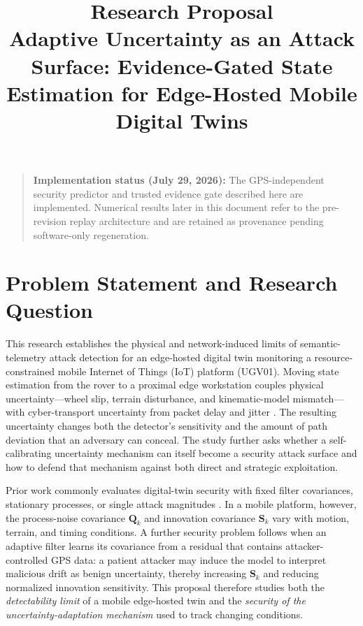 \documentclass[11pt,a4paper]{article}
\title{\textbf{Research Proposal}\\ Adaptive Uncertainty as an Attack Surface: Evidence-Gated State Estimation for Edge-Hosted Mobile Digital Twins}
\author{}
\date{}
\begin{document}
\maketitle

\begin{quote}
\textbf{Implementation status (July 29, 2026):} The GPS-independent security
predictor and trusted evidence gate described here are implemented. Numerical
results later in this document refer to the pre-revision replay architecture
and are retained as provenance pending software-only regeneration.
\end{quote}

\section{Problem Statement and Research Question}

This research establishes the physical and network-induced limits of semantic-telemetry attack detection for an edge-hosted digital twin monitoring a resource-constrained mobile Internet of Things (IoT) platform (UGV01). Moving state estimation from the rover to a proximal edge workstation couples physical uncertainty---wheel slip, terrain disturbance, and kinematic-model mismatch---with cyber-transport uncertainty from packet delay and jitter \cite{ref48,ref61}. The resulting uncertainty changes both the detector's sensitivity and the amount of path deviation that an adversary can conceal. The study further asks whether a self-calibrating uncertainty mechanism can itself become a security attack surface and how to defend that mechanism against both direct and strategic exploitation.

Prior work commonly evaluates digital-twin security with fixed filter covariances, stationary processes, or single attack magnitudes \cite{ref3,ref40}. In a mobile platform, however, the process-noise covariance $\mathbf{Q}_k$ and innovation covariance $\mathbf{S}_k$ vary with motion, terrain, and timing conditions. A further security problem follows when an adaptive filter learns its covariance from a residual that contains attacker-controlled GPS data: a patient attacker may induce the model to interpret malicious drift as benign uncertainty, thereby increasing $\mathbf{S}_k$ and reducing normalized innovation sensitivity. This proposal therefore studies both the \emph{detectability limit} of a mobile edge-hosted twin and the \emph{security of the uncertainty-adaptation mechanism} used to track changing conditions.
\end{document}
